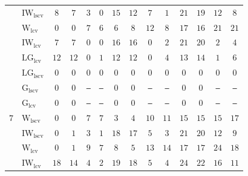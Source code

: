 \begin{table}[!htp]
\begin{tabular}{clcccccccccccc}
 & $\mathrm{IW}_{\mathrm{lscv}}$ & \cellcolor{black!10}$8$ & \cellcolor{black!10}$7$ & $3$ & $0$ & \cellcolor{black!10}$15$ & \cellcolor{black!10}$12$ & $7$ & $1$ & \cellcolor{black!30}$21$ & \cellcolor{black!10}$19$ & $12$ & $8$ \\
 & $\mathrm{W}_{\mathrm{lcv}}$ & $0$ & $0$ & \cellcolor{black!10}$7$ & \cellcolor{black!10}$6$ & $6$ & $8$ & \cellcolor{black!10}$12$ & \cellcolor{black!10}$8$ & \cellcolor{black!10}$17$ & $16$ & \cellcolor{black!10}$21$ & \cellcolor{black!10}$21$ \\
 & $\mathrm{IW}_{\mathrm{lcv}}$ & $7$ & \cellcolor{black!10}$7$ & $0$ & $0$ & \cellcolor{black!30}$16$ & \cellcolor{black!30}$16$ & $0$ & $2$ & \cellcolor{black!30}$21$ & \cellcolor{black!30}$20$ & $2$ & $4$ \\
 & $\mathrm{LG}_{\mathrm{lcv}}$ & \cellcolor{black!30}$12$ & \cellcolor{black!30}$12$ & $0$ & $1$ & $12$ & \cellcolor{black!10}$12$ & $0$ & $4$ & $13$ & $14$ & $1$ & $6$ \\
 & $\mathrm{LG}_{\mathrm{lscv}}$ & $0$ & $0$ & $0$ & $0$ & $0$ & $0$ & $0$ & $0$ & $0$ & $0$ & $0$ & $0$ \\
 & $\mathrm{G}_{\mathrm{lscv}}$ & $0$ & $0$ & \texttt{---} & \texttt{---} & $0$ & $0$ & \texttt{---} & \texttt{---} & $0$ & $0$ & \texttt{---} & \texttt{---} \\
 & $\mathrm{G}_{\mathrm{lcv}}$ & $0$ & $0$ & \texttt{---} & \texttt{---} & $0$ & $0$ & \texttt{---} & \texttt{---} & $0$ & $0$ & \texttt{---} & \texttt{---} \\
\midrule
$7$ & $\mathrm{W}_{\mathrm{lscv}}$ & $0$ & $0$ & \cellcolor{black!10}$7$ & \cellcolor{black!10}$7$ & $3$ & $4$ & \cellcolor{black!10}$10$ & \cellcolor{black!10}$11$ & $15$ & $15$ & $15$ & \cellcolor{black!10}$17$ \\
 & $\mathrm{IW}_{\mathrm{lscv}}$ & $0$ & $1$ & $3$ & $1$ & \cellcolor{black!10}$18$ & \cellcolor{black!10}$17$ & $5$ & $3$ & \cellcolor{black!10}$21$ & \cellcolor{black!10}$20$ & $12$ & $9$ \\
 & $\mathrm{W}_{\mathrm{lcv}}$ & $0$ & $1$ & \cellcolor{black!30}$9$ & \cellcolor{black!10}$7$ & $8$ & $5$ & \cellcolor{black!30}$13$ & \cellcolor{black!30}$14$ & $17$ & $17$ & \cellcolor{black!30}$24$ & \cellcolor{black!30}$18$ \\
 & $\mathrm{IW}_{\mathrm{lcv}}$ & \cellcolor{black!30}$18$ & \cellcolor{black!30}$14$ & $4$ & $2$ & \cellcolor{black!30}$19$ & \cellcolor{black!30}$18$ & $5$ & $4$ & \cellcolor{black!30}$24$ & \cellcolor{black!30}$22$ & \cellcolor{black!10}$16$ & $11$ \\

\end{tabular}
\end{table}
